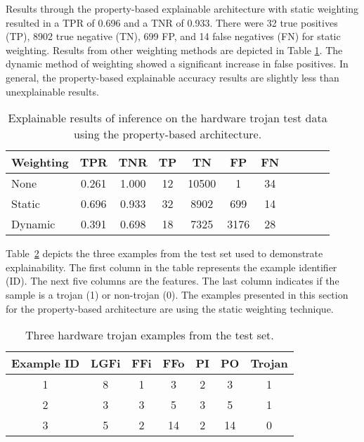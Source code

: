 Results through the property-based explainable architecture with static
weighting resulted in a TPR of 0.696 and a TNR of 0.933. There were 32 true
positives (TP), 8902 true negative (TN), 699 FP, and 14 false negatives (FN) for
static weighting. Results from other weighting methods are depicted in Table
\ref{tab_exp_weight_comp}.  The dynamic method of weighting showed a significant
increase in false positives. In general, the property-based explainable accuracy
results are slightly less than unexplainable results.

\begin{table}[H]
    \renewcommand{\arraystretch}{1.3}
    \caption{Explainable results of inference on the hardware trojan test data using the property-based architecture.}
    \begin{center}
    \begin{tabular}{|l|c|c|c|c|c|c|c|c|c|c|}
        \hline
         Weighting &  TPR &  TNR &  TP &  TN &  FP &  FN \\
        \hline
        \hline
        None  & 0.261 & 1.000 & 12 & 10500 & 1 & 34 \\
        \hline
        Static & 0.696 & 0.933 & 32 & 8902 & 699 & 14 \\
        \hline
        Dynamic & 0.391 & 0.698 & 18 & 7325 & 3176 & 28 \\
        \hline
    \end{tabular}
    \end{center}
    \label{tab_exp_weight_comp}
\end{table}


Table~\ref{tab_ex} depicts the three examples from the test set used to
demonstrate explainability. The first column in the table represents the example
identifier (ID). The next five columns are the features.  The last column
indicates if the sample is a trojan (1) or non-trojan (0). The examples
presented in this section for the property-based architecture are using the
static weighting technique.

\begin{table}[H]
    \renewcommand{\arraystretch}{1.3}
    \caption{Three hardware trojan examples from the test set.}
    \begin{center}
    \begin{tabular}{|c|c|c|c|c|c|c|}
        \hline
         Example ID &  LGFi &  FFi &  FFo &  PI &  PO &  Trojan \\
        \hline
        \hline
        1 & 8 & 1 & 3 & 2 & 3 & 1 \\
        \hline
        2 & 3 & 3 & 5 & 3 & 5 & 1 \\
        \hline
        3 & 5 & 2 & 14 & 2 & 14 & 0 \\
        \hline
    \end{tabular}
    \end{center}
    \label{tab_ex}
\end{table}

